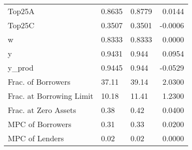 \begin{table}
\begin{tabular}{lllr}
                  Top25A &  0.8635 &   0.8779 &  0.0144 \\
                  Top25C &  0.3507 &   0.3501 & -0.0006 \\
                       w &  0.8333 &   0.8333 &  0.0000 \\
                       y &  0.9431 &    0.944 &  0.0954 \\
                  y\_prod &  0.9445 &    0.944 & -0.0529 \\
      Frac. of Borrowers &   37.11 &    39.14 &  2.0300 \\
Frac. at Borrowing Limit &   10.18 &    11.41 &  1.2300 \\
    Frac. at Zero Assets &    0.38 &     0.42 &  0.0400 \\
        MPC of Borrowers &    0.31 &     0.33 &  0.0200 \\
          MPC of Lenders &    0.02 &     0.02 &  0.0000 \\
\bottomrule
\end{tabular}
\end{table}
